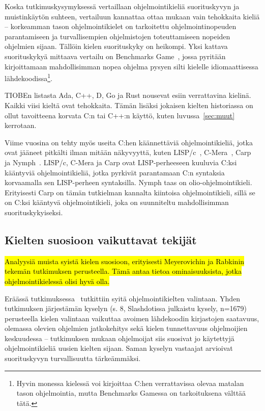 Koska tutkimuskysymyksessä vertaillaan ohjelmointikieliä suorituskyvyn ja
muistinkäytön suhteen, vertailuun kannattaa ottaa mukaan vain tehokkaita kieliä
-- korkeamman tason ohjelmointikielet on tarkoitettu ohjelmointinopeuden
parantamiseen ja turvallisempien ohjelmistojen toteuttamiseen nopeiden
ohjelmien sijaan. Tällöin kielen suorituskyky on heikompi. Yksi kattava
suorituskykyä mittaava vertailu on Benchmarks Game~\citep{benchmarks}, jossa
pyritään kirjoittamaan mahdollisimman nopea ohjelma pysyen silti kielelle
idiomaattisessa lähdekoodissa\footnote{Hyvin monessa kielessä voi kirjoittaa
C:hen verrattavissa olevaa matalan tason ohjelmointia, mutta Benchmarks Gamessa
on tarkoituksena välttää tätä.}.

TIOBEn listasta Ada, C++, D, Go ja Rust nousevat esiin verrattavina kielinä.
Kaikki viisi kieltä ovat tehokkaita. Tämän lisäksi jokaisen kielten historiassa
on ollut tavoitteena korvata C:n tai C++:n käyttö, kuten luvussa~\ref{sec:muut}
kerrotaan.

Viime vuosina on tehty myös useita C:hen käännettäviä ohjelmointikieliä, jotka
ovat jääneet pitkälti ilman mitään näkyvyyttä, kuten LISP/c~\citep{clisp1},
C-Mera~\citep{clisp2}, Carp~\citep{clisp3} ja Nymph~\citep{nymph}. LISP/c,
C-Mera ja Carp ovat LISP-perheeseen kuuluvia C:ksi kääntyviä ohjelmointikieliä,
jotka pyrkivät parantamaan C:n syntaksia korvaamalla sen LISP-perheen
syntaksilla. Nymph taas on olio-ohjelmointikieli. Erityisesti Carp on tämän
tutkielman kannalta kiintoisa ohjelmointikieli, sillä se on C:ksi kääntyvä
ohjelmointikieli, joka on suunniteltu mahdollisimman suorituskykyiseksi.


\subsection{Kielten suosioon vaikuttavat tekijät}

\hl{Analyysiä muista syistä kielen suosioon, erityisesti Meyerovichin ja
Rabkinin tekemän tutkimuksen perusteella. Tämä antaa tietoa ominaisuuksista,
jotka ohjelmointikielessä olisi hyvä olla.}

Eräässä tutkimuksessa~\citep{empiricalpopularity} tutkittiin syitä
ohjelmointikielten valintaan. Yhden tutkimuksen järjestämän kyselyn (s. 8,
\mbox{Slashdotissa} julkaistu kysely, n=1679) perusteella kielen valintaan
vaikuttaa avoimen lähdekoodin kirjastojen saatavuus, olemassa olevien ohjelmien
jatkokehitys sekä kielen tunnettavuus ohjelmoijien keskuudessa -- tutkimuksen
mukaan ohjelmoijat siis suosivat jo käytettyjä ohjelmointikieliä uusien kielten
sijaan. Saman kyselyn vastaajat arvioivat suorituskyvyn turvallisuutta
tärkeämmäksi.

